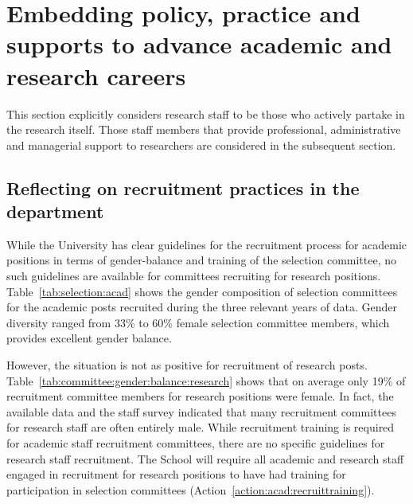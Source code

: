 \newpage 
\section{Embedding policy, practice and supports to advance academic and research careers}
\label{sec:academic}

This section explicitly considers research staff to be those who actively partake in the research itself. Those staff members that provide professional, administrative and managerial support to researchers are considered in the subsequent section.

\subsection{Reflecting on recruitment practices in the department}




While the University has clear guidelines for the recruitment process for academic positions in terms of gender-balance and training of the selection committee, no such guidelines are available for committees recruiting for research positions. Table~\ref{tab:selection:acad} shows the gender composition of selection committees for the academic posts recruited during the three relevant years of data. Gender diversity ranged from 33\% to 60\% female selection committee members, which provides excellent gender balance.



However, the situation is not as positive for recruitment of research posts. Table~\ref{tab:committee:gender:balance:research} shows that on average only 19\% of recruitment committee members for research positions were female. In fact, the available data and the staff survey indicated that many recruitment committees for research staff are often entirely male. 
While recruitment training is required for academic staff recruitment committees, there are no specific guidelines for research staff recruitment. The School will require all academic and research staff engaged in recruitment for research positions to have had training for participation in selection committees (Action~\ref{action:acad:recruittraining}).


